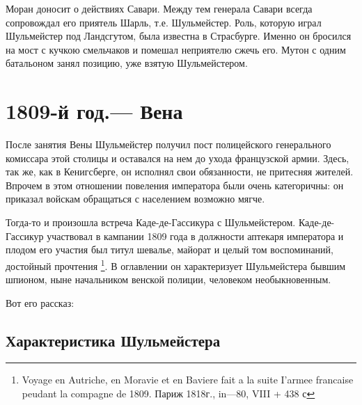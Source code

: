 \documentclass[
  oneside,
  12pt,
  titlepage]{book}
\begin{document}
Моран доносит о действиях Савари. Между тем генерала Савари всегда сопровождал его приятель Шарль, т.е. Шульмейстер. Роль, которую играл Шульмейстер под Ландсгутом, была известна в Страсбурге. Именно он бросился на мост с кучкою смельчаков и помешал неприятелю сжечь его. Мутон с одним батальоном занял позицию, уже взятую Шульмейстером.

\hypertarget{ux439-ux433ux43eux434.-ux432ux435ux43dux430}{%
\chapter{1809-й год.--- Вена}\label{ux439-ux433ux43eux434.-ux432ux435ux43dux430}}

После занятия Вены Шульмейстер получил пост полицейского генерального комиссара этой столицы и оставался на нем до ухода французской армии. Здесь, так же, как в Кенигсберге, он исполнял свои обязанности, не притесняя жителей. Впрочем в этом отношении повеления императора были очень категоричны: он приказал войскам обращаться с населением возможно мягче.

Тогда-то и произошла встреча Каде-де-Гассикура с Шульмейстером. Каде-де-Гассикур участвовал в кампании 1809 года в должности аптекаря императора и плодом его участия был титул шевалье, майорат и целый том воспоминаний, достойный прочтения \footnote{Voyage en Autriche, en Moravie et en Baviere fait a la suite I'armee francaise peudant la compagne de 1809. Париж 1818г., in---80, VIII + 438 с}. В оглавлении он характеризует Шульмейстера бывшим шпионом, ныне начальником венской полиции, человеком необыкновенным.

Вот его рассказ:

\hypertarget{ux445ux430ux440ux430ux43aux442ux435ux440ux438ux441ux442ux438ux43aux430-ux448ux443ux43bux44cux43cux435ux439ux441ux442ux435ux440ux430}{%
\section{Характеристика Шульмейстера}\label{ux445ux430ux440ux430ux43aux442ux435ux440ux438ux441ux442ux438ux43aux430-ux448ux443ux43bux44cux43cux435ux439ux441ux442ux435ux440ux430}}
\end{document}
